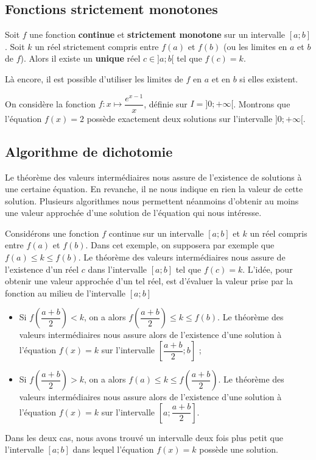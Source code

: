 \documentclass[11pt,fleqn, openany]{book} %
\begin{document}
\subsection{Fonctions strictement monotones}

\begin{theorem} Soit $f$ une fonction \textbf{continue} et \textbf{strictement monotone} sur un intervalle $[a;b]$ . Soit $k$ un réel strictement compris entre $f(a)$ et $f(b)$ (ou les limites en $a$ et $b$ de $f$). Alors il existe un \textbf{unique} réel $c \in ]a;b[$ tel que $f(c)=k$.\end{theorem}

Là encore, il est possible d'utiliser les limites de $f$ en $a$ et en $b$ si elles existent.

\begin{example} On considère la fonction $f:x\mapsto \dfrac{e^{x-1}}{x}$, définie sur $I=]0;+\infty[$.
Montrons que l'équation $f(x)=2$ possède exactement deux solutions sur l'intervalle $]0;+\infty[$.


\vskip450pt
   


 \end{example}

\newpage

\subsection{Algorithme de dichotomie}

Le théorème des valeurs intermédiaires nous assure de l'existence de solutions à une certaine équation. En revanche, il ne nous indique en rien la valeur de cette solution. Plusieurs algorithmes nous permettent néanmoins d'obtenir au moins une valeur approchée d'une solution de l'équation qui nous intéresse.

Considérons une fonction $f$ continue sur un intervalle $[a;b]$ et $k$ un réel compris entre $f(a)$ et $f(b)$. Dans cet exemple, on supposera par exemple que $f(a) \leqslant k \leqslant f(b)$. Le théorème des valeurs intermédiaires nous assure de l'existence d'un réel $c$ dans l'intervalle $[a;b]$ tel que $f(c)=k$. L'idée, pour obtenir une valeur approchée d'un tel réel, est d'évaluer la valeur prise par la fonction au milieu de l'intervalle $[a;b]$
\begin{itemize}
\item Si $f\left(\dfrac{a+b}{2}\right) < k$, on a alors $f\left(\dfrac{a+b}{2}\right) \leqslant k \leqslant f(b)$. Le théorème des valeurs intermédiaires nous assure alors de l'existence d'une solution à l'équation $f(x)=k$ sur l'intervalle $\left[\dfrac{a+b}{2};b\right]$ ;
\item Si $f\left(\dfrac{a+b}{2}\right) > k$, on a alors $f(a) \leqslant k \leqslant f\left(\dfrac{a+b}{2}\right)$. Le théorème des valeurs intermédiaires nous assure alors de l'existence d'une solution à l'équation $f(x)=k$ sur l'intervalle $\left[a;\dfrac{a+b}{2}\right]$.
\end{itemize}
Dans les deux cas, nous avons trouvé un intervalle deux fois plus petit que l'intervalle $[a;b]$ dans lequel l'équation $f(x)=k$ possède une solution. 
\end{document}
